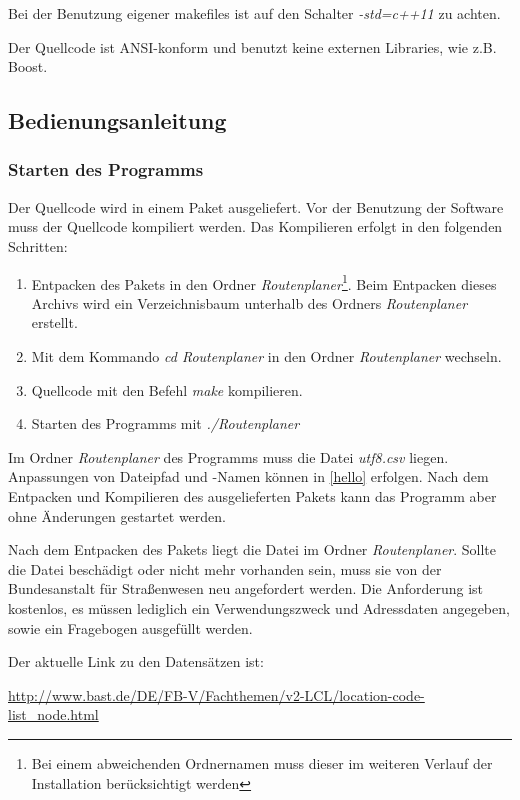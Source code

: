 \documentclass[12pt, a4paper, ngerman]{article}
\begin{document}
Bei der Benutzung eigener makefiles ist auf den Schalter \textit{-std=c++11} zu achten. 

Der Quellcode ist ANSI-konform und benutzt keine externen Libraries, wie z.B. Boost.

\subsection{Bedienungsanleitung \label{Bedienungsanleitung}}
\subsubsection{Starten des Programms}
Der Quellcode wird in einem Paket ausgeliefert. Vor der Benutzung der Software muss der Quellcode kompiliert werden. Das Kompilieren erfolgt in den folgenden Schritten:
\begin{enumerate}
	\item Entpacken des Pakets in den Ordner \textit{Routenplaner}\footnote{Bei einem abweichenden Ordnernamen muss dieser im weiteren Verlauf der Installation berücksichtigt werden}. Beim Entpacken dieses Archivs wird ein Verzeichnisbaum unterhalb des Ordners \textit{Routenplaner} erstellt.
	\item Mit dem Kommando \textit{cd Routenplaner} in den Ordner \textit{Routenplaner} wechseln.
	\item Quellcode mit den Befehl \textit{make} kompilieren.
	\item Starten des Programms mit \textit{./Routenplaner}
\end{enumerate}

Im Ordner \textit{Routenplaner} des Programms muss die Datei \textit{utf8.csv} liegen. Anpassungen von Dateipfad und -Namen können in \ref{hello} erfolgen. Nach dem Entpacken und Kompilieren des ausgelieferten Pakets kann das Programm aber ohne Änderungen gestartet werden.

Nach dem Entpacken des Pakets liegt die Datei im Ordner \textit{Routenplaner}. Sollte die Datei beschädigt oder nicht mehr vorhanden sein, muss sie von der Bundesanstalt für Straßenwesen neu angefordert werden. Die Anforderung ist kostenlos, es müssen lediglich ein Verwendungszweck und Adressdaten angegeben, sowie ein Fragebogen ausgefüllt werden.

Der aktuelle Link zu den Datensätzen ist:  

\href{http://www.bast.de/DE/FB-V/Fachthemen/v2-LCL/location-code-list\_node.html}{http://www.bast.de/DE/FB-V/Fachthemen/v2-LCL/location-code-list\_node.html}
\end{document}
